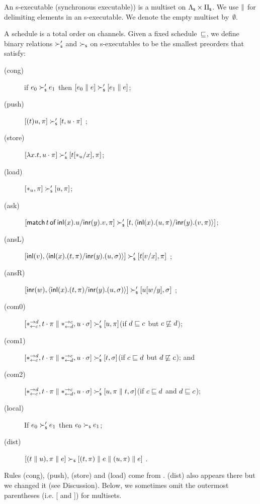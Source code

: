 An s-executable (synchronous executable))
is a multiset on $\sLambda\times\sPi$.
We use $\conc$ for delimiting elements in an s-executable.
We denote the empty multiset by~$\emptyset$.

A schedule is a total order on channels.
Given a fixed schedule~$\sche$,
we define binary relations $\sred'$ and $\sred$
on s-executables
to be the smallest preorders
that satisfy:
\begin{description}
 \item[(cong)] if
      $e_0         \sred' e_1$
      then
      $[e_0 \conc e] \sred' [e_1\conc e]$\enspace;
 \item[(push)]
	    $[(t)u,\pi]      \sred' [t,u\cdot\pi]$      \enspace;
 \item[(store)]
	    $[\lambda x.t,u\cdot\pi]
	     \sred'
	     [t[\ast_u/x],      \pi]$\enspace;
 \item[(load)]
	    $[\ast_u,\pi]\sred' [u,\pi]$\enspace;
 \item[(ask)]
      $[\mat t x u y v,\pi]\sred' [t,\mats x u \pi y v \pi]$\enspace;
 \item[(ansL)]
           $[\inl{v}, \mats xt\pi yu\sigma] \sred' [t[v/x],\pi] $ \enspace;
 \item[(ansR)]
           $[\inr{w}, \mats xt\pi yu\sigma] \sred' [u[w/y],\sigma] $ \enspace;
 \item[(com0)]
           $[\comod c{d}, t\cdot\pi\conc \comod{d}c,
           u\cdot\sigma] \sred'
           [u,\pi]$\enspace(if $d\sche c$ but $c\not\sche d$)\enspace;
 \item[(com1)]
	    $[\comod c{d}, t\cdot\pi\conc \comod{d}c,
	    u\cdot\sigma] \sred'
	    [t,\sigma]$\enspace(if $c\sche d$ but $d\not\sche c$)\enspace; and
 \item[(com2)]
	    $[\comod c{d}, t\cdot\pi\conc \comod{d}c,
	    u\cdot\sigma] \sred'
	    [u,\pi\conc t,\sigma]$\enspace(if $c\sche d$ and $d\sche
       c$)\enspace;
 \item[(local)] If $e_0\sred'e_1$ then $e_0\sred e_1$\enspace;
 \item[(dist)]
           $[(t\conc u),\pi\conc e]  \sred [(t,\pi)\conc e\conc (u,\pi)\conc
      e]$ \enspace.
\end{description}
Rules (cong), (push), (store) and (load) come from
\citet{danos-krivine}.  (dist) also appears there but we changed it (see
Discussion).
Below, we sometimes omit the outermost parentheses (i.e. [ and ]) for multisets.

